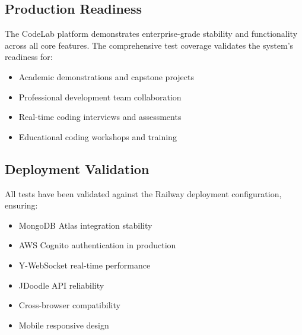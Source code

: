 \subsection{Production Readiness}
The CodeLab platform demonstrates enterprise-grade stability and functionality across all core features. The comprehensive test coverage validates the system's readiness for:
\begin{itemize}
    \item Academic demonstrations and capstone projects
    \item Professional development team collaboration
    \item Real-time coding interviews and assessments
    \item Educational coding workshops and training
\end{itemize}

\subsection{Deployment Validation}
All tests have been validated against the Railway deployment configuration, ensuring:
\begin{itemize}
    \item MongoDB Atlas integration stability
    \item AWS Cognito authentication in production
    \item Y-WebSocket real-time performance
    \item JDoodle API reliability
    \item Cross-browser compatibility
    \item Mobile responsive design
\end{itemize}
